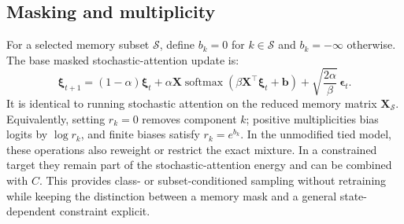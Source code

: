 \subsection{Masking and multiplicity}

For a selected memory subset $\mathcal S$, define
$b_k=0$ for $k\in\mathcal S$ and $b_k=-\infty$ otherwise. The base masked
stochastic-attention update is:
\begin{equation}
\boldsymbol\xi_{t+1}
=(1-\alpha)\boldsymbol\xi_t
+\alpha\mathbf X\operatorname{softmax}\!\left(
\beta\mathbf X^\top\boldsymbol\xi_t+\mathbf b\right)
+\sqrt{\frac{2\alpha}{\beta}}\,\boldsymbol\epsilon_t.
\label{eq:masked-sa}
\end{equation}
It is identical to running stochastic attention on the reduced memory matrix
$\mathbf X_{\mathcal S}$. Equivalently, setting $r_k=0$ removes component $k$;
positive multiplicities bias logits by $\log r_k$, and finite biases satisfy
$r_k=e^{b_k}$. In the unmodified tied model, these operations also reweight or
restrict the exact mixture. In a constrained target they remain part of the
stochastic-attention energy and can be combined with $C$. This provides class-
or subset-conditioned sampling without retraining while keeping the distinction
between a memory mask and a general state-dependent constraint explicit.
